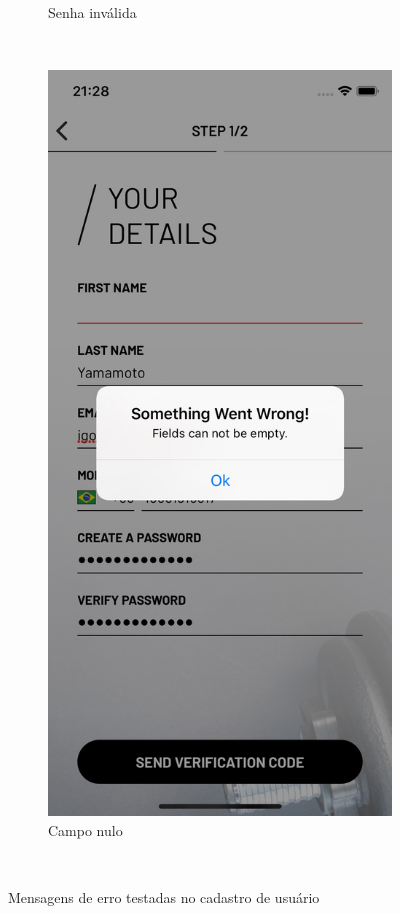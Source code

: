 \begin{figure}[H]
\begin{subfigure}[b]{0.3\textwidth}
        \caption{Senha inválida}
        \label{fig:password-not-valid}
    \end{subfigure}
    ~
    \begin{subfigure}[b]{0.3\textwidth}
        \includegraphics[width=\textwidth]{pfc/figuras/fields-empty.png}
        \caption{Campo nulo}
        \label{fig:empty-fields}
    \end{subfigure}
    ~
    \caption{Mensagens de erro testadas no cadastro de usuário}
    \label{fig:error-messages-test}
\end{figure}

